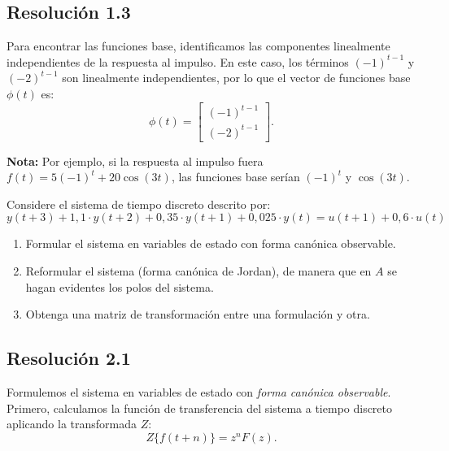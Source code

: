 \documentclass[
  11pt,
  letterpaper,
   addpoints,
  answers
  ]{exam}
\begin{document}
\begin{questions}
\begin{solution}
\subsection*{Resolución 1.3}

Para encontrar las funciones base, identificamos las componentes linealmente independientes de la respuesta al impulso. En este caso, los términos $(-1)^{t-1}$ y $(-2)^{t-1}$ son linealmente independientes, por lo que el vector de funciones base $\phi(t)$ es:
\begin{equation}
\phi(t) = 
\begin{bmatrix}
(-1)^{t-1} \\
(-2)^{t-1}
\end{bmatrix}.
\end{equation}

	\textbf{Nota:} Por ejemplo, si la respuesta al impulso fuera $f(t)=5(-1)^t+20\cos(3t)$, las funciones base serían $(-1)^t$ y $\cos(3t)$.
\end{solution}

  \question Considere el sistema de tiempo discreto descrito por:
\begin{equation*}
  y(t+3) + 1{,}1 \cdot y(t+2) + 0{,}35 \cdot y(t+1) + 0{,}025 \cdot y(t) = u(t+1) + 0{,}6 \cdot u(t)
\end{equation*}
\begin{enumerate}
    \item Formular el sistema en variables de estado con forma canónica observable.
    \item Reformular el sistema (forma canónica de Jordan), de manera que en $A$ se hagan evidentes los polos del sistema.
    \item Obtenga una matriz de transformación entre una formulación y otra.
\end{enumerate}

\begin{solution}

\subsection*{Resolución 2.1}

Formulemos el sistema en variables de estado con \emph{forma canónica observable}. Primero, calculamos la función de transferencia del sistema a tiempo discreto aplicando la transformada $Z$:
\begin{equation}
Z\{f(t+n)\} = z^n F(z).
\end{equation}


\end{solution}
\end{questions}
\end{document}
